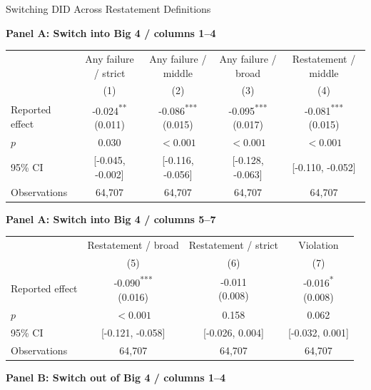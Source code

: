 \documentclass[10pt]{article}
\newcommand{\sym}[1]{\textsuperscript{#1}}
\begin{document}
\fontsize{10}{12}\selectfont
\setlength{\tabcolsep}{3pt}\renewcommand{\arraystretch}{1.15}
\begin{center}\large Switching DID Across Restatement Definitions\end{center}
\medskip\textbf{Panel A: Switch into Big 4 / columns 1--4}\par\smallskip
\begin{tabular*}{\textwidth}{@{\extracolsep{\fill}}lcccc@{}}
\toprule
 & Any failure / strict & Any failure / middle & Any failure / broad & Restatement / middle \\
 & (1) & (2) & (3) & (4) \\
\midrule
Reported effect & \shortstack{-0.024\sym{**}\\(0.011)} & \shortstack{-0.086\sym{***}\\(0.015)} & \shortstack{-0.095\sym{***}\\(0.017)} & \shortstack{-0.081\sym{***}\\(0.015)} \\
$p$ & 0.030 & $<0.001$ & $<0.001$ & $<0.001$ \\
95\% CI & [-0.045, -0.002] & [-0.116, -0.056] & [-0.128, -0.063] & [-0.110, -0.052] \\
Observations & 64,707 & 64,707 & 64,707 & 64,707 \\
\bottomrule\end{tabular*}\par
\medskip\textbf{Panel A: Switch into Big 4 / columns 5--7}\par\smallskip
\begin{tabular*}{\textwidth}{@{\extracolsep{\fill}}lccc@{}}
\toprule
 & Restatement / broad & Restatement / strict & Violation \\
 & (5) & (6) & (7) \\
\midrule
Reported effect & \shortstack{-0.090\sym{***}\\(0.016)} & \shortstack{-0.011\\(0.008)} & \shortstack{-0.016\sym{*}\\(0.008)} \\
$p$ & $<0.001$ & 0.158 & 0.062 \\
95\% CI & [-0.121, -0.058] & [-0.026, 0.004] & [-0.032, 0.001] \\
Observations & 64,707 & 64,707 & 64,707 \\
\bottomrule\end{tabular*}\par
\medskip\textbf{Panel B: Switch out of Big 4 / columns 1--4}\par\smallskip
\end{document}
